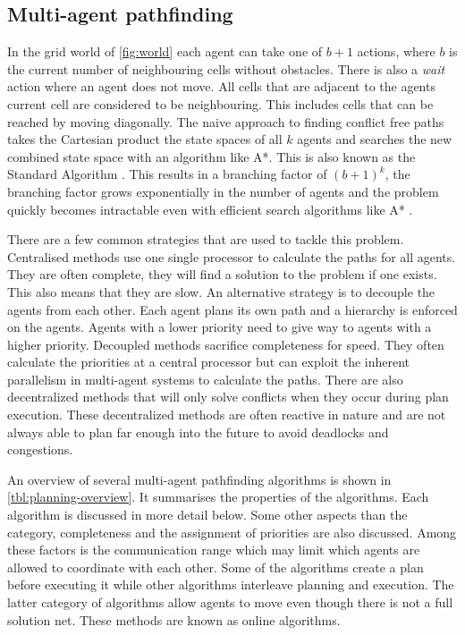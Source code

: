 \subsection{Multi-agent pathfinding}
In the grid world of \autoref{fig:world} each agent can take one of $b+1$
actions, where $b$ is the current number of neighbouring cells without
obstacles. There is also a \textit{wait} action
where an agent does not move. All cells that are adjacent to the agents current
cell are considered to be neighbouring. This includes cells that can be reached
by moving diagonally. The naive approach to finding conflict free paths takes
the Cartesian product the state spaces of all $k$ agents and searches the new
combined state space with an algorithm like A*. This is also known as the
Standard Algorithm \cite{standley2010}. This results in a branching factor of
$(b+1)^k$, the branching factor grows exponentially in the number of agents and
the problem quickly becomes intractable even with efficient search algorithms
like A* \cite{sharon2013}.

There are a few common strategies that are used to tackle this problem.
Centralised methods use one single processor to calculate the paths for all
agents. They are often complete, they will find a solution to the problem if
one exists. This also means that they are slow. An alternative strategy is to
decouple the agents from each other. Each agent plans its own path and a
hierarchy is enforced on the agents. Agents with a lower priority need
to give way to agents with a higher priority. Decoupled methods sacrifice
completeness for speed. They often calculate the priorities at a central
processor but can exploit the inherent parallelism in multi-agent systems to
calculate the paths. There are also decentralized methods that will only solve
conflicts when they occur during plan execution. These decentralized methods
are often reactive in nature and are not always able to plan far enough into
the future to avoid deadlocks and congestions.

An overview of several multi-agent pathfinding algorithms is shown in
\autoref{tbl:planning-overview}. It summarises the properties of the
algorithms. Each algorithm is discussed in more detail below. Some other
aspects than the category, completeness and the assignment of priorities are
also discussed. Among these factors is the communication range which may limit
which agents are allowed to coordinate with each other. Some of the algorithms
create a plan before executing it while other algorithms interleave planning
and execution. The latter category of algorithms allow agents to move even
though there is not a full solution net. These methods are known as online
algorithms.

